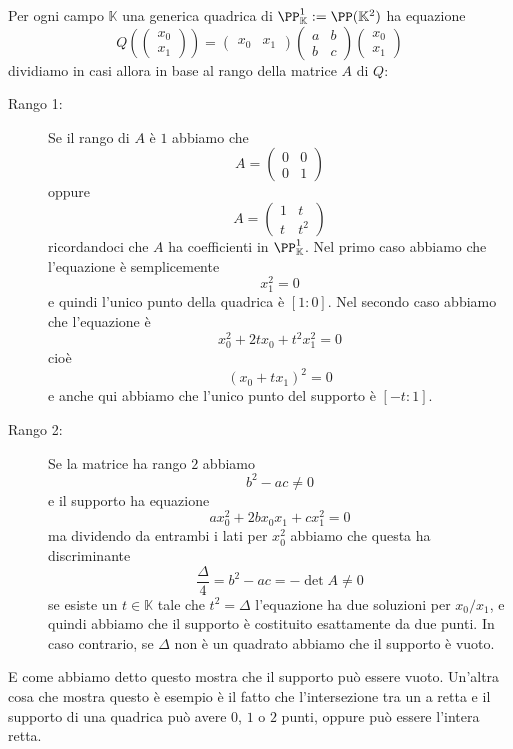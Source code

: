 \documentclass[11pt]{scrartcl}
\newcommand{\KK}{\mathbb{K}}
\begin{document}
	\begin{example}[Quadriche in $\PP^1$]
		Per ogni campo $\KK$ una generica quadrica di $\PP^1_\KK:=\PP(\KK^2)$ ha equazione
		$$Q\left(\begin{pmatrix}
			x_0 \\
			x_1
		\end{pmatrix}\right)=
		\begin{pmatrix}
			x_0 & x_1
		\end{pmatrix}\begin{pmatrix}
		a & b \\
		b & c
		\end{pmatrix}
		\begin{pmatrix}
			x_0 \\
			x_1
		\end{pmatrix}$$
		dividiamo in casi allora in base al rango della matrice $A$ di $Q$:
		\begin{description}
			\item[Rango 1:] Se il rango di $A$ è $1$ abbiamo che
			$$A=
			\begin{pmatrix}
				0 & 0 \\
				0 & 1
			\end{pmatrix}
			$$
			oppure 
			$$A=
			\begin{pmatrix}
				1 & t \\
				t & t^2
			\end{pmatrix}
			$$
			ricordandoci che $A$ ha coefficienti in $\PP^1_\KK$. Nel primo caso abbiamo che l'equazione è semplicemente 
			$$x_1^2=0$$
			e quindi l'unico punto della quadrica è $[1:0]$. Nel secondo caso abbiamo che l'equazione è
			$$x_0^2+2tx_0+t^2x_1^2=0$$
			cioè
			$$(x_0+tx_1)^2=0$$
			e anche qui abbiamo che l'unico punto del supporto è $[-t:1]$.
			\item[Rango 2:] Se la matrice ha rango $2$ abbiamo
			$$b^2-ac\ne 0$$
			e il supporto ha equazione
			$$ax_0^2+2bx_0x_1+cx_1^2=0$$
			ma dividendo da entrambi i lati per $x_0^2$ abbiamo che questa ha discriminante 
			$$\frac{\Delta}{4}=b^2-ac=-\det A \ne 0$$
			se esiste un $t\in \KK$ tale che $t^2=\Delta$ l'equazione ha due soluzioni per $x_0/x_1$, e quindi abbiamo che il supporto è costituito esattamente da due punti. In caso contrario, se $\Delta$ non è un quadrato abbiamo che il supporto è vuoto.
		\end{description}
	\end{example}
	E come abbiamo detto questo mostra che il supporto può essere vuoto. Un'altra cosa che mostra questo è esempio è il fatto che l'intersezione tra un a retta e il supporto di una quadrica può avere $0$, $1$ o $2$ punti, oppure può essere l'intera retta.
\end{document}
